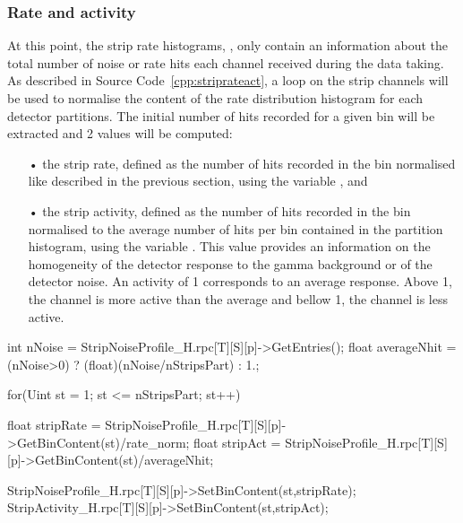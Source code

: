 		\subsubsection{Rate and activity}
		\label{app2:sssec:rateact}
		
	At this point, the strip rate histograms, , only contain an information about the total number of noise or rate hits each channel received during the data taking. As described in Source Code~\ref{cpp:striprateact}, a loop on the strip channels will be used to normalise the content of the rate distribution histogram for each detector partitions. The initial number of hits recorded for a given bin will be extracted and 2 values will be computed:

	\begin{itemize}
		\item[•] the strip rate, defined as the number of hits recorded in the bin normalised like described in the previous section, using the variable , and
		\item[•] the strip activity, defined as the number of hits recorded in the bin normalised to the average number of hits per bin contained in the partition histogram, using the variable . This value provides an information on the homogeneity of the detector response to the gamma background or of the detector noise. An activity of 1 corresponds to an average response. Above 1, the channel is more active than the average and bellow 1, the channel is less active.
	\end{itemize}
	
	\begin{code}
	\begin{cppcode}
int nNoise = StripNoiseProfile_H.rpc[T][S][p]->GetEntries();	
float averageNhit = (nNoise>0) ? (float)(nNoise/nStripsPart) : 1.;

for(Uint st = 1; st <= nStripsPart; st++){
	float stripRate =
		StripNoiseProfile_H.rpc[T][S][p]->GetBinContent(st)/rate_norm;
	float stripAct =
		StripNoiseProfile_H.rpc[T][S][p]->GetBinContent(st)/averageNhit;

	StripNoiseProfile_H.rpc[T][S][p]->SetBinContent(st,stripRate);
	StripActivity_H.rpc[T][S][p]->SetBinContent(st,stripAct);
}
	\end{cppcode}
	\label{cpp:striprateact}
	\vspace{5mm}
	\end{code}
	
